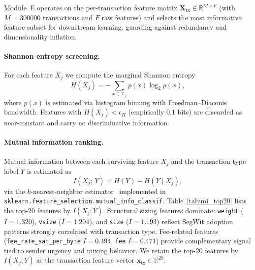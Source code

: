 \documentclass[journal]{IEEEtran}
\begin{document}
Module~E operates on the per-transaction feature matrix
$\mathbf{X}_{\mathrm{tx}} \in \mathbb{R}^{M \times F}$ (with
$M = \num{300000}$ transactions and $F$ raw features) and selects the most
informative feature subset for downstream learning, guarding against
redundancy and dimensionality inflation.

\paragraph{Shannon entropy screening.}
For each feature $X_j$ we compute the marginal Shannon entropy
\begin{equation}
  H(X_j) = -\sum_{x \in \mathcal{X}_j} p(x)\log_2 p(x),
  \label{eq:entropy}
\end{equation}
where $p(x)$ is estimated via histogram binning with Freedman--Diaconis
bandwidth.
Features with $H(X_j) < \epsilon_H$ (empirically $0.1$ bits) are discarded
as near-constant and carry no discriminative information.

\paragraph{Mutual information ranking.}
Mutual information between each surviving feature $X_j$ and the transaction
type label $Y$ is estimated as
\begin{equation}
  I(X_j;\, Y) = H(Y) - H(Y \mid X_j),
  \label{eq:mi}
\end{equation}
via the $k$-nearest-neighbor estimator~\cite{Kraskov2004} implemented in
\texttt{sklearn.feature\_selection.mutual\_info\_classif}.
Table~\ref{tab:mi_top20} lists the top-20 features by $I(X_j; Y)$.
Structural sizing features dominate: \texttt{weight} ($I = 1.320$),
\texttt{vsize} ($I = 1.204$), and \texttt{size} ($I = 1.193$) reflect
SegWit adoption patterns strongly correlated with transaction type.
Fee-related features (\texttt{fee\_rate\_sat\_per\_byte} $I = 0.494$,
\texttt{fee} $I = 0.471$) provide complementary signal tied to sender
urgency and mixing behavior.
We retain the top-20 features by $I(X_j; Y)$ as the transaction feature
vector $\mathbf{x}_{\mathrm{tx}} \in \mathbb{R}^{20}$.
\end{document}
